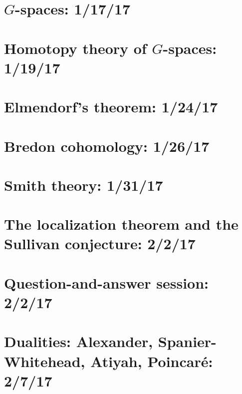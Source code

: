 \documentclass{style_EHT}
\begin{document}
\frontstuff

\section{$G$-spaces: 1/17/17}
	
\section{Homotopy theory of $G$-spaces: 1/19/17}
	
\section{Elmendorf's theorem: 1/24/17}
	
\section{Bredon cohomology: 1/26/17}
	
\section{Smith theory: 1/31/17}
	
\section{The localization theorem and the Sullivan conjecture: 2/2/17}
	
\section{Question-and-answer session: 2/2/17}
	
\section{Dualities: Alexander, Spanier-Whitehead, Atiyah, Poincaré: 2/7/17}
	

{}

\end{document}
